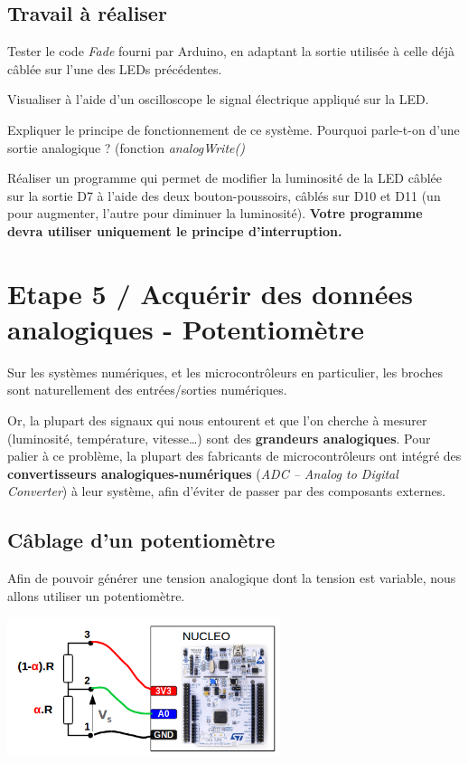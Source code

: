\documentclass[a4paper,11pt,titlepage]{article} %
\begin{document}
\subsection{Travail à réaliser}

\Manip Tester le code \textsl{Fade} fourni par Arduino, en adaptant la sortie utilisée à celle déjà câblée sur l'une des LEDs précédentes. 

\Manip Visualiser à l'aide d'un oscilloscope le signal électrique appliqué sur la LED.

\Quest Expliquer le principe de fonctionnement de ce système. Pourquoi parle-t-on d'une sortie analogique ? (fonction \textsl{analogWrite()}

\Manip Réaliser un programme qui permet de modifier la luminosité de la LED câblée sur la sortie D7 à l'aide des deux bouton-poussoirs, câblés sur D10 et D11 (un pour augmenter, l'autre pour diminuer la luminosité). \textbf{Votre programme devra utiliser uniquement le principe d'interruption.}


\newpage
\section{Etape 5 / Acquérir des données analogiques - Potentiomètre}

Sur les systèmes numériques, et les microcontrôleurs en particulier, les broches sont naturellement des entrées/sorties numériques.

Or, la plupart des signaux qui nous entourent et que l'on cherche à mesurer (luminosité, température, vitesse…) sont des \textbf{grandeurs analogiques}. Pour palier à ce problème, la plupart des fabricants de microcontrôleurs ont intégré des \textbf{convertisseurs analogiques-numériques} (\textit{ADC – Analog to Digital Converter}) à leur système, afin d'éviter de passer par des composants externes.


\subsection{Câblage d'un potentiomètre}

Afin de pouvoir générer une tension analogique dont la tension est variable, nous allons utiliser un potentiomètre.

\begin{center}
	\includegraphics[width=0.6\textwidth]{images/MINE_Nucleo_CablagePotentiometre.png}
\end{center}
\end{document}
